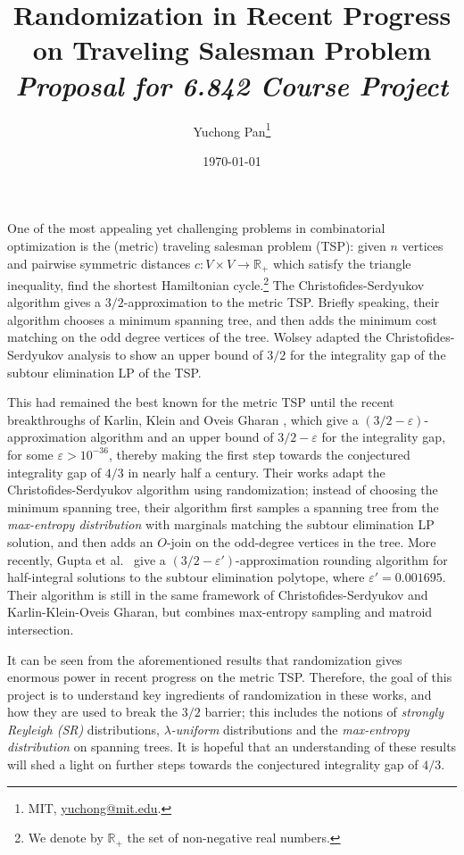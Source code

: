 \documentclass[letterpaper, reqno,12pt]{article}
\newcommand{\RR}{\mathbb{R}}
\begin{document}
\title{\Large Randomization in Recent Progress on Traveling Salesman Problem \\ {\large \em Proposal for 6.842 Course Project}}
\author{Yuchong Pan\thanks{MIT, \href{mailto:yuchong@mit.edu}{yuchong@mit.edu}.}}
\date{\today}
\newtheorem{theorem}{Theorem}[section]
\newtheorem{lemma}[theorem]{Lemma}
\newtheorem{corollary}[theorem]{Corollary}
\theoremstyle{definition} \newtheorem{defn}{Definition}
\maketitle
%

One of the most appealing yet challenging problems in combinatorial optimization is the (metric) traveling salesman problem (TSP): given $n$ vertices and pairwise symmetric distances $c : V \times V \to \RR_+$ which satisfy the triangle inequality, find the shortest Hamiltonian cycle.\footnote{We denote by $\RR_+$ the set of non-negative real numbers.} The Christofides-Serdyukov algorithm \cite{christofides1976worst,serdyukov1978nekotorykh} gives a $3/2$-approximation to the metric TSP. Briefly speaking, their algorithm chooses a minimum spanning tree, and then adds the minimum cost matching on the odd degree vertices of the tree. Wolsey \cite{wolsey1980heuristic} adapted the Christofides-Serdyukov analysis to show an upper bound of $3/2$ for the integrality gap of the subtour elimination LP of the TSP.

This had remained the best known for the metric TSP until the recent breakthroughs of Karlin, Klein and Oveis Gharan \cite{karlin2021slightly,karlin2021slightlyig}, which give a $(3/2 - \varepsilon)$-approximation algorithm and an upper bound of $3/2 - \varepsilon$ for the integrality gap, for some $\varepsilon > 10^{-36}$, thereby making the first step towards the conjectured integrality gap of $4/3$ in nearly half a century. Their works adapt the Christofides-Serdyukov algorithm using randomization; instead of choosing the minimum spanning tree, their algorithm first samples a spanning tree from the \emph{max-entropy distribution} with marginals matching the subtour elimination LP solution, and then adds an $O$-join on the odd-degree vertices in the tree. More recently, Gupta et al.\ \cite{gupta2021matroid} give a $(3/2 - \varepsilon')$-approximation rounding algorithm for half-integral solutions to the subtour elimination polytope, where $\varepsilon' = 0.001695$. Their algorithm is still in the same framework of Christofides-Serdyukov and Karlin-Klein-Oveis Gharan, but combines max-entropy sampling and matroid intersection.

It can be seen from the aforementioned results that randomization gives enormous power in recent progress on the metric TSP. Therefore, the goal of this project is to understand key ingredients of randomization in these works, and how they are used to break the $3/2$ barrier; this includes the notions of \emph{strongly Reyleigh (SR)} distributions, \emph{$\lambda$-uniform} distributions and the \emph{max-entropy distribution} on spanning trees. It is hopeful that an understanding of these results will shed a light on further steps towards the conjectured integrality gap of $4/3$.



\end{document}
